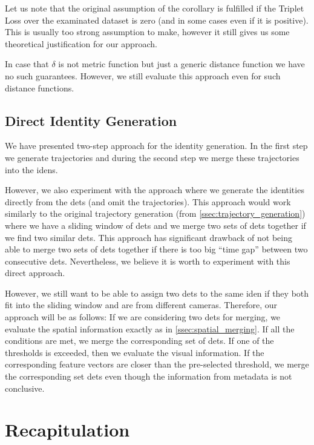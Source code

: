 Let us note that the original assumption of the corollary is fulfilled if the Triplet Loss
over the examinated dataset is zero (and in some cases even if it is positive).
This is usually too strong assumption to make, however it still gives us some
theoretical justification for our approach.

In case that $\delta$ is not metric function but just a generic distance
function we have no such guarantees. However, we still evaluate this approach
even for such distance functions.

\subsection{Direct Identity Generation}

We have presented two-step approach for the identity generation. In the first step we generate
trajectories and during the second step we merge these trajectories into
the \glspl{iden}.

However, we also experiment with the approach where we generate the identities directly from the \glspl{det} (and omit the trajectories). This approach would work similarly to the original trajectory generation (from \autoref{ssec:trajectory_generation}) where we have a sliding window of \glspl{det} and we merge two sets of \glspl{det} together if we find two similar \glspl{det}. This approach has significant drawback of not being able to merge two sets of \glspl{det} together if there is too big ``time gap'' between two consecutive \glspl{det}. Nevertheless, we believe it is worth to experiment with this direct approach.

However, we still want to be able to assign two \glspl{det} to the
same \gls{iden} if they both fit into the sliding window and are from different cameras. Therefore, our approach will be as follows: If we are
considering two \glspl{det} for merging, we evaluate the spatial information
exactly as in \autoref{ssec:spatial_merging}. If all the conditions are met,
we merge the corresponding set of \glspl{det}. If one of the thresholds is
exceeded, then we evaluate the visual information. If the corresponding feature
vectors are closer than the pre-selected threshold, we merge the corresponding set \glspl{det} even though the information from metadata is not conclusive.

\section{Recapitulation}

